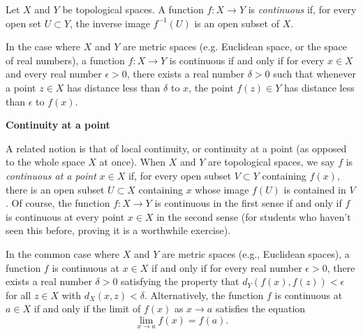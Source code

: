 \documentclass{article}
\begin{document}
Let $X$ and $Y$ be topological spaces. A function $f\colon X \to Y$ is {\em continuous} if, for every open set $U \subset Y$, the inverse image $f^{-1}(U)$ is an open subset of $X$.

In the case where $X$ and $Y$ are metric spaces (e.g. Euclidean space, or the space of real numbers), a function $f\colon X \to Y$ is continuous if and only if for every $x \in X$ and every real number $\epsilon > 0$, there exists a real number $\delta > 0$ such that whenever a point $z \in X$ has distance less than $\delta$ to $x$, the point $f(z) \in Y$ has distance less than $\epsilon$ to $f(x)$.

{\bf Continuity at a point}

A related notion is that of local continuity, or continuity at a point (as opposed  to the whole space $X$ at once). When $X$ and $Y$ are topological spaces, we say $f$ is {\em continuous at a point} $x \in X$ if, for every open subset $V \subset Y$ containing $f(x)$, there is an open subset $U \subset X$ containing $x$ whose image $f(U)$ is contained in $V$. Of course, the function $f\colon X \to Y$ is continuous in the first sense if and only if $f$ is continuous at every point $x \in X$ in the second sense (for students who haven't seen this before, proving it is a worthwhile exercise).

In the common case where $X$ and $Y$ are metric spaces (e.g., Euclidean spaces), a function $f$ is continuous at $x \in X$ if and only if for every real number $\epsilon > 0$, there exists a real number $\delta > 0$ satisfying the property that $d_Y(f(x),f(z)) < \epsilon$ for all $z \in X$ with $d_X(x,z) < \delta$.
Alternatively, the function $f$ is continuous at $a \in X$ if and only if the limit of $f(x)$ as $x \to a$ satisfies the equation
$$
\lim_{x \to a} f(x) = f(a).
$$
\end{document}
